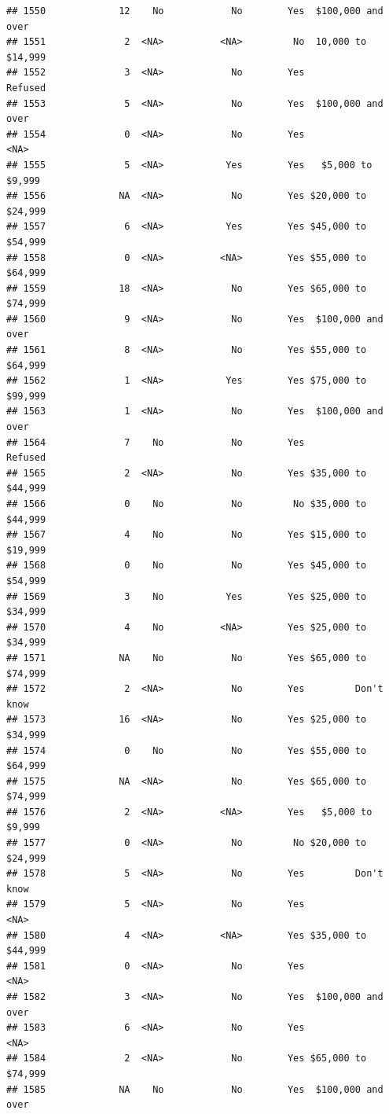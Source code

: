 \documentclass[man]{apa6}
\begin{document}
\begin{verbatim}
## 1550             12    No            No        Yes  $100,000 and over
## 1551              2  <NA>          <NA>         No  10,000 to $14,999
## 1552              3  <NA>            No        Yes            Refused
## 1553              5  <NA>            No        Yes  $100,000 and over
## 1554              0  <NA>            No        Yes               <NA>
## 1555              5  <NA>           Yes        Yes   $5,000 to $9,999
## 1556             NA  <NA>            No        Yes $20,000 to $24,999
## 1557              6  <NA>           Yes        Yes $45,000 to $54,999
## 1558              0  <NA>          <NA>        Yes $55,000 to $64,999
## 1559             18  <NA>            No        Yes $65,000 to $74,999
## 1560              9  <NA>            No        Yes  $100,000 and over
## 1561              8  <NA>            No        Yes $55,000 to $64,999
## 1562              1  <NA>           Yes        Yes $75,000 to $99,999
## 1563              1  <NA>            No        Yes  $100,000 and over
## 1564              7    No            No        Yes            Refused
## 1565              2  <NA>            No        Yes $35,000 to $44,999
## 1566              0    No            No         No $35,000 to $44,999
## 1567              4    No            No        Yes $15,000 to $19,999
## 1568              0    No            No        Yes $45,000 to $54,999
## 1569              3    No           Yes        Yes $25,000 to $34,999
## 1570              4    No          <NA>        Yes $25,000 to $34,999
## 1571             NA    No            No        Yes $65,000 to $74,999
## 1572              2  <NA>            No        Yes         Don't know
## 1573             16  <NA>            No        Yes $25,000 to $34,999
## 1574              0    No            No        Yes $55,000 to $64,999
## 1575             NA  <NA>            No        Yes $65,000 to $74,999
## 1576              2  <NA>          <NA>        Yes   $5,000 to $9,999
## 1577              0  <NA>            No         No $20,000 to $24,999
## 1578              5  <NA>            No        Yes         Don't know
## 1579              5  <NA>            No        Yes               <NA>
## 1580              4  <NA>          <NA>        Yes $35,000 to $44,999
## 1581              0  <NA>            No        Yes               <NA>
## 1582              3  <NA>            No        Yes  $100,000 and over
## 1583              6  <NA>            No        Yes               <NA>
## 1584              2  <NA>            No        Yes $65,000 to $74,999
## 1585             NA    No            No        Yes  $100,000 and over

\end{verbatim}
\end{document}
